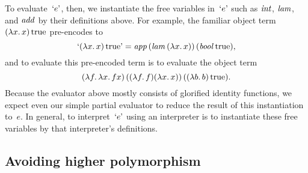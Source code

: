\documentclass[preprint]{sigplanconf}
\newcommand{\fun}[1]{\mathopen{\lambda\mathord{#1}.\,}}
\newcommand{\True}{\mathinner{\mathrm{true}}}
\newcommand{\encode}[1]{\mathinner{\mathopen{\text{`}}#1\mathclose{\text{'}}}}
\newcommand{\ident}[1]{\mathinner{\text{\textit{#1\/}}}}
\begin{document}
To evaluate~$\encode{e}$, then, we
instantiate the free variables in~$\encode{e}$ such as $\ident{int}$,
$\ident{lam}$, and $\ident{add}$ by their definitions above.  For
example, the familiar object term $(\fun{x}x)\True$ pre-encodes to
\begin{equation*}
    \encode{(\fun{x}x)\True} = \ident{app}
    (\ident{lam} (\fun{x} x))\, (\ident{bool} \True),
\end{equation*}
and to evaluate this pre-encoded term is to evaluate the object term
\begin{equation*}
    (\fun{f} \fun{x} fx) \,
    ((\fun{f} f) (\fun{x} x))\, ((\fun{b} b) \True).
\end{equation*}
Because the evaluator above mostly consists of glorified identity
functions, we expect even our simple partial evaluator to reduce the
result of this instantiation to~$e$.  In general, to
interpret~$\encode{e}$ using an interpreter is to instantiate these free
variables by that interpreter's definitions.

\subsection{Avoiding higher polymorphism}
\end{document}
